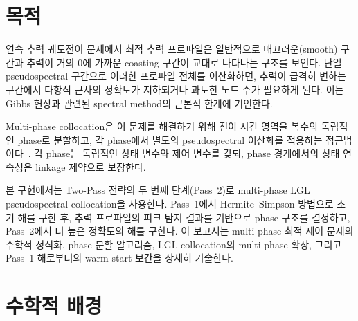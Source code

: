 \documentclass[11pt]{article}
\begin{document}
\drawborder
\thispagestyle{firstpage}

\def\lighterdate{February 12, 2026}

\begin{abstract}
연속 추력 궤도전이 문제에서 최적 추력 프로파일은 매끄러운 구간과 추력이 거의 0에 가까운 coasting 구간이 교대로 나타나는 구조를 보인다.
단일 pseudospectral 구간으로 이를 이산화하면 추력이 급격히 변하는 구간에서 다항식 근사의 정확도가 저하된다.
본 보고서는 multi-phase LGL pseudospectral collocation의 수학적 정식화, phase 분할 알고리즘, Pass~1 해로부터의 warm start 보간, 그리고 수치 검증 기준을 상세히 기술한다.
\end{abstract}

\section{목적}
\label{sec:purpose}

연속 추력 궤도전이 문제에서 최적 추력 프로파일은 일반적으로 매끄러운(smooth) 구간과 추력이 거의 0에 가까운 coasting 구간이 교대로 나타나는 구조를 보인다.
단일 pseudospectral 구간으로 이러한 프로파일 전체를 이산화하면, 추력이 급격히 변하는 구간에서 다항식 근사의 정확도가 저하되거나 과도한 노드 수가 필요하게 된다.
이는 Gibbs 현상과 관련된 spectral method의 근본적 한계에 기인한다.

Multi-phase collocation은 이 문제를 해결하기 위해 전이 시간 영역을 복수의 독립적인 phase로 분할하고, 각 phase에서 별도의 pseudospectral 이산화를 적용하는 접근법이다~\cite{Patterson2014}.
각 phase는 독립적인 상태 변수와 제어 변수를 갖되, phase 경계에서의 상태 연속성은 linkage 제약으로 보장한다.

본 구현에서는 Two-Pass 전략의 두 번째 단계(Pass~2)로 multi-phase LGL pseudospectral collocation을 사용한다.
Pass~1에서 Hermite--Simpson 방법으로 초기 해를 구한 후, 추력 프로파일의 피크 탐지 결과를 기반으로 phase 구조를 결정하고, Pass~2에서 더 높은 정확도의 해를 구한다.
이 보고서는 multi-phase 최적 제어 문제의 수학적 정식화, phase 분할 알고리즘, LGL collocation의 multi-phase 확장, 그리고 Pass~1 해로부터의 warm start 보간을 상세히 기술한다.


\section{수학적 배경}
\label{sec:math}
\end{document}
